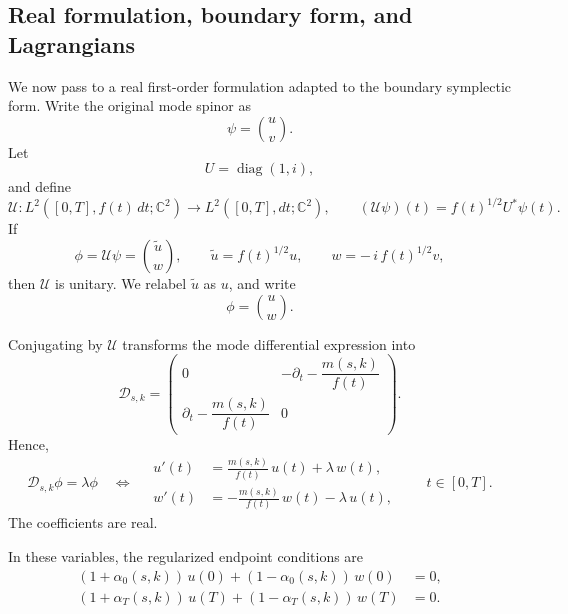 \documentclass[11pt]{article}
\theoremstyle{definition}
\numberwithin{equation}{section}
\begin{document}
\subsection{Real formulation, boundary form, and Lagrangians}\label{subsec:real_formulation_symplectic_space}

We now pass to a real first-order formulation adapted to the boundary symplectic form. Write the original mode spinor as
\begin{equation}
\psi=\binom{u}{v}.
\end{equation}
Let
\begin{equation}
U=\operatorname{diag}(1,i),
\end{equation}
and define
\begin{equation}
\mathcal U:L^2([0,T],f(t)\,dt;\mathbb C^2)\longrightarrow L^2([0,T],dt;\mathbb C^2),
\qquad
(\mathcal U\psi)(t)=f(t)^{1/2}U^\ast \psi(t).
\end{equation}
If
\begin{equation}
\phi=\mathcal U\psi=\binom{\tilde u}{w},
\qquad
\tilde u=f(t)^{1/2}u,
\qquad
w=-\,i\,f(t)^{1/2}v,
\end{equation}
then \(\mathcal U\) is unitary. We relabel \(\tilde u\) as \(u\), and write
\begin{equation}
\phi=\binom{u}{w}.
\end{equation}

Conjugating by \(\mathcal U\) transforms the mode differential expression into
\begin{equation}\label{eq:Duw-operator}
\mathcal D_{s,k}
=
\begin{pmatrix}
0 & -\partial_t-\dfrac{m(s,k)}{f(t)} \\
\partial_t-\dfrac{m(s,k)}{f(t)} & 0
\end{pmatrix}.
\end{equation}
Hence,
\begin{equation}\label{eq:uw-system}
\mathcal D_{s,k}\phi=\lambda\phi
\quad\Longleftrightarrow\quad
\begin{aligned}
u'(t) &= \frac{m(s,k)}{f(t)}\,u(t)+\lambda\,w(t),\\
w'(t) &= -\frac{m(s,k)}{f(t)}\,w(t)-\lambda\,u(t),
\end{aligned}
\qquad t\in[0,T].
\end{equation}
The coefficients are real.

In these variables, the regularized endpoint conditions are
\begin{equation}\label{eq:bc_tanh_clean}
\begin{aligned}
(1+\alpha_0(s,k))\,u(0)+(1-\alpha_0(s,k))\,w(0)&=0,\\
(1+\alpha_T(s,k))\,u(T)+(1-\alpha_T(s,k))\,w(T)&=0.
\end{aligned}
\end{equation}
\end{document}
